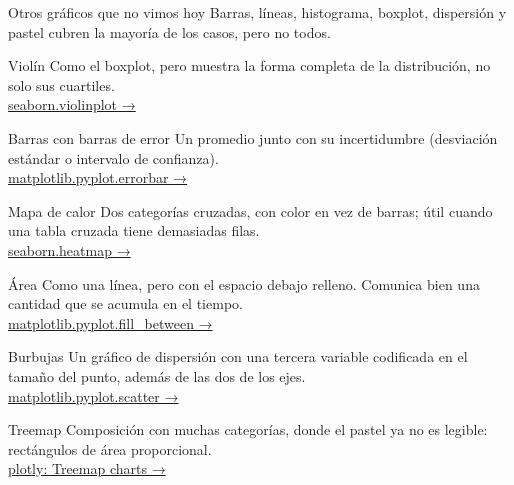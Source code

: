\documentclass[aspectratio=169,11pt]{beamer}
\begin{document}
\begin{frame}[allowframebreaks]{Otros gráficos que no vimos hoy}
  \small
  Barras, líneas, histograma, boxplot, dispersión y pastel cubren la
  mayoría de los casos, pero no todos.
  \begin{exampleblock}{Violín}
    \small Como el boxplot, pero muestra la forma completa de la
    distribución, no solo sus cuartiles.\\
    \href{https://seaborn.pydata.org/generated/seaborn.violinplot.html}{\color{esumerOrange}seaborn.violinplot →}
  \end{exampleblock}
  \begin{exampleblock}{Barras con barras de error}
    \small Un promedio junto con su incertidumbre (desviación estándar o
    intervalo de confianza).\\
    \href{https://matplotlib.org/stable/api/_as_gen/matplotlib.pyplot.errorbar.html}{\color{esumerOrange}matplotlib.pyplot.errorbar →}
  \end{exampleblock}
  \begin{exampleblock}{Mapa de calor}
    \small Dos categorías cruzadas, con color en vez de barras; útil
    cuando una tabla cruzada tiene demasiadas filas.\\
    \href{https://seaborn.pydata.org/generated/seaborn.heatmap.html}{\color{esumerOrange}seaborn.heatmap →}
  \end{exampleblock}

  \begin{exampleblock}{Área}
    \small Como una línea, pero con el espacio debajo relleno. Comunica
    bien una cantidad que se acumula en el tiempo.\\
    \href{https://matplotlib.org/stable/api/_as_gen/matplotlib.pyplot.fill_between.html}{\color{esumerOrange}matplotlib.pyplot.fill\_between →}
  \end{exampleblock}
  \begin{exampleblock}{Burbujas}
    \small Un gráfico de dispersión con una tercera variable codificada en
    el tamaño del punto, además de las dos de los ejes.\\
    \href{https://matplotlib.org/stable/api/_as_gen/matplotlib.pyplot.scatter.html}{\color{esumerOrange}matplotlib.pyplot.scatter →}
  \end{exampleblock}
  \begin{exampleblock}{Treemap}
    \small Composición con muchas categorías, donde el pastel ya no es
    legible: rectángulos de área proporcional.\\
    \href{https://plotly.com/python/treemaps/}{\color{esumerOrange}plotly: Treemap charts →}
  \end{exampleblock}
\end{frame}
\end{document}
